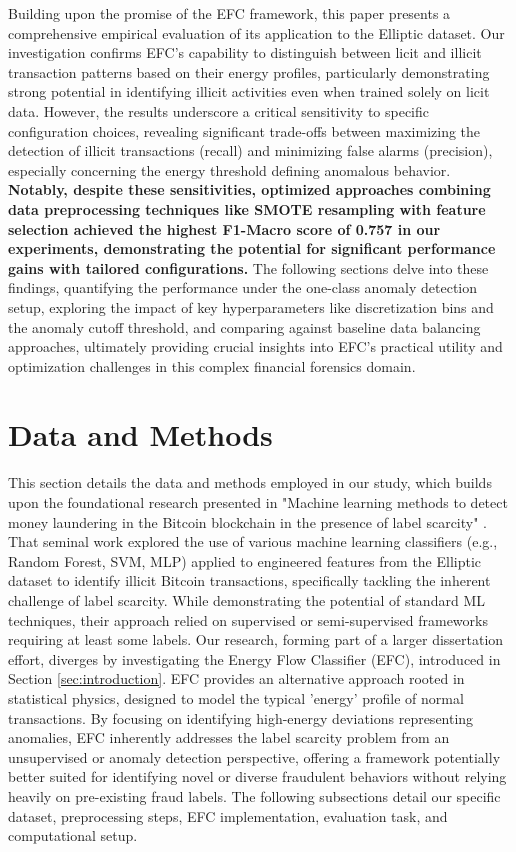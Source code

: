 \documentclass[12pt]{article}
\begin{document}
Building upon the promise of the EFC framework, this paper presents a comprehensive empirical evaluation of its application
to the Elliptic dataset. Our investigation confirms EFC's capability to distinguish between licit and illicit transaction
patterns based on their energy profiles, particularly demonstrating strong potential in identifying illicit activities even
when trained solely on licit data. However, the results underscore a critical sensitivity to specific configuration choices,
revealing significant trade-offs between maximizing the detection of illicit transactions (recall) and minimizing false
alarms (precision), especially concerning the energy threshold defining anomalous behavior. \textbf{Notably, despite these
sensitivities, optimized approaches combining data preprocessing techniques like SMOTE resampling with feature selection
achieved the highest F1-Macro score of 0.757 in our experiments, demonstrating the potential for significant performance
gains with tailored configurations.} The following sections delve into these findings, quantifying the performance under
the one-class anomaly detection setup, exploring the impact of key hyperparameters like discretization bins and the anomaly
cutoff threshold, and comparing against baseline data balancing approaches, ultimately providing crucial insights into
EFC's practical utility and optimization challenges in this complex financial forensics domain.


\section{Data and Methods} \label{sec:methods}
This section details the data and methods employed in our study, which builds upon the foundational research presented in
"Machine learning methods to detect money laundering in the Bitcoin blockchain in the presence of label scarcity"
\cite{lorenz2021machinelearningmethodsdetect}. That seminal work explored the use of various machine learning classifiers
(e.g., Random Forest, SVM, MLP) applied to engineered features from the Elliptic dataset to identify illicit Bitcoin transactions,
specifically tackling the inherent challenge of label scarcity. While demonstrating the potential of standard ML techniques,
their approach relied on supervised or semi-supervised frameworks requiring at least some labels. Our research, forming
part of a larger dissertation effort, diverges by investigating the Energy Flow Classifier (EFC), introduced in Section
\ref{sec:introduction}. EFC provides an alternative approach rooted in statistical physics, designed to model the typical
'energy' profile of normal transactions. By focusing on identifying high-energy deviations representing anomalies, EFC
inherently addresses the label scarcity problem from an unsupervised or anomaly detection perspective, offering a framework
potentially better suited for identifying novel or diverse fraudulent behaviors without relying heavily on pre-existing
fraud labels. The following subsections detail our specific dataset, preprocessing steps, EFC implementation, evaluation
task, and computational setup.
\end{document}
